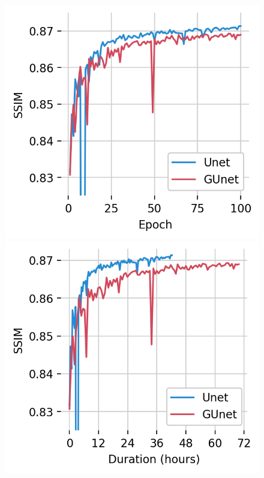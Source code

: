 \begin{figure}[ht]
    \centering
    \begin{subcaptionblock}[t]{0.49\textwidth}
        \centering
        \includegraphics[width=\textwidth]{images/val_ssim_epoch.png}
        \caption{\label{fig:val_ssim_epoch}}
    \end{subcaptionblock}
    \begin{subcaptionblock}[t]{0.49\textwidth}
        \centering
        \includegraphics[width=\textwidth]{images/val_ssim_duration.png}

\end{subcaptionblock}
\end{figure}
